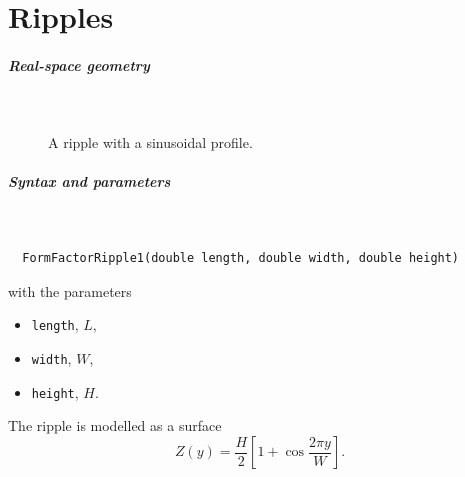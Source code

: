 
\chapter{Ripples}\label{SRipple}


 \label{SRipple1}

\paragraph{Real-space geometry}\strut\\

\begin{figure}[H]
\hfill
{}
\hfill
{}
\hfill
{}
\hfill
\caption{A ripple with a sinusoidal profile.}
\end{figure}

\paragraph{Syntax and parameters}\strut\\[-2ex plus .2ex minus .2ex]
\begin{lstlisting}
  FormFactorRipple1(double length, double width, double height)
\end{lstlisting}
with the parameters
\begin{itemize}
\item \texttt{length}, $L$,
\item \texttt{width}, $W$,
\item \texttt{height}, $H$.
\end{itemize}

The ripple is modelled as a surface
\begin{equation*}
  Z(y) = \frac{H}{2}\left[ 1 + \cos\frac{2\pi y}{W} \right].
\end{equation*}

